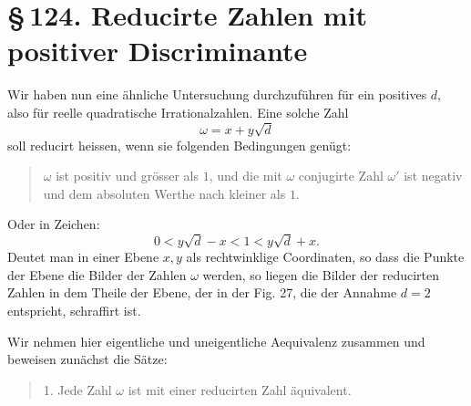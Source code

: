 \documentclass[11pt]{article}
\providecommand{\sect}[2]{\section*{\S\,#1. #2}}
\begin{document}
\sect{124}{Reducirte Zahlen mit positiver Discriminante}

Wir haben nun eine ähnliche Untersuchung durchzuführen für ein positives $d$, also für reelle quadratische Irrationalzahlen. Eine solche Zahl
\[
        \omega=x+y\sqrt d
\]
soll reducirt heissen, wenn sie folgenden Bedingungen genügt:
\begin{quote}
$\omega$ ist positiv und grösser als $1$, und die mit $\omega$ conjugirte Zahl $\omega'$ ist negativ und dem absoluten Werthe nach kleiner als $1$.
\end{quote}
Oder in Zeichen:
\[
\tag{1}        0<y\sqrt d-x<1<y\sqrt d+x.
\]
Deutet man in einer Ebene $x,y$ als rechtwinklige Coordinaten, so dass die Punkte der Ebene die Bilder der Zahlen $\omega$ werden, so liegen die Bilder der reducirten Zahlen in dem Theile der Ebene, der in der Fig. 27, die der Annahme $d=2$ entspricht, schraffirt ist.

\begin{figure}[h]
\centering
{}
\par{}
\end{figure}

Wir nehmen hier eigentliche und uneigentliche Aequivalenz zusammen und beweisen zunächst die Sätze:

\begin{quote}
1. Jede Zahl $\omega$ ist mit einer reducirten Zahl äquivalent.
\end{quote}
\end{document}
